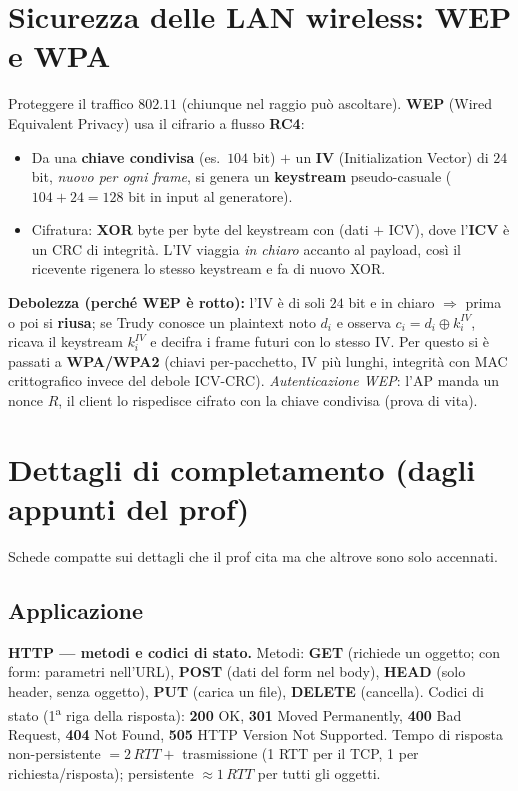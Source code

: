 \documentclass[11pt,a4paper]{report}
\begin{document}
\section{Sicurezza delle LAN wireless: WEP e WPA}
\label{th:wep}
Proteggere il traffico $802.11$ (chiunque nel raggio può ascoltare). \textbf{WEP}
(Wired Equivalent Privacy) usa il cifrario a flusso \textbf{RC4}:
\begin{itemize}[noitemsep]
\item Da una \textbf{chiave condivisa} (es.\ $104$ bit) $+$ un \textbf{IV}
(Initialization Vector) di $24$ bit, \emph{nuovo per ogni frame}, si genera un
\textbf{keystream} pseudo-casuale ($104{+}24=128$ bit in input al generatore).
\item Cifratura: \textbf{XOR} byte per byte del keystream con (dati $+$ ICV),
dove l'\textbf{ICV} è un CRC di integrità. L'IV viaggia \emph{in chiaro} accanto
al payload, così il ricevente rigenera lo stesso keystream e fa di nuovo XOR.
\end{itemize}
\textbf{Debolezza (perché WEP è rotto):} l'IV è di soli $24$ bit e in chiaro
$\Rightarrow$ prima o poi si \textbf{riusa}; se Trudy conosce un plaintext noto
$d_i$ e osserva $c_i=d_i\oplus k_i^{IV}$, ricava il keystream $k_i^{IV}$ e decifra
i frame futuri con lo stesso IV. Per questo si è passati a \textbf{WPA/WPA2}
(chiavi per-pacchetto, IV più lunghi, integrità con MAC crittografico invece del
debole ICV-CRC). \emph{Autenticazione WEP}: l'AP manda un nonce $R$, il client
lo rispedisce cifrato con la chiave condivisa (prova di vita).

\section{Dettagli di completamento (dagli appunti del prof)}
Schede compatte sui dettagli che il prof cita ma che altrove sono solo accennati.

\subsection*{Applicazione}
\textbf{HTTP --- metodi e codici di stato.} Metodi: \textbf{GET} (richiede un
oggetto; con form: parametri nell'URL), \textbf{POST} (dati del form nel body),
\textbf{HEAD} (solo header, senza oggetto), \textbf{PUT} (carica un file),
\textbf{DELETE} (cancella). Codici di stato (1\textsuperscript{a} riga della
risposta): \textbf{200} OK, \textbf{301} Moved Permanently, \textbf{400} Bad
Request, \textbf{404} Not Found, \textbf{505} HTTP Version Not Supported. Tempo
di risposta non-persistente $=2\,RTT+$ trasmissione (1 RTT per il TCP, 1 per
richiesta/risposta); persistente $\approx 1\,RTT$ per tutti gli oggetti.
\end{document}
